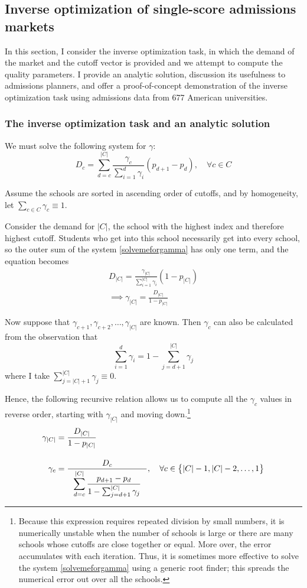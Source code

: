 \documentclass[12pt]{article}
\theoremstyle{definition}
\begin{document}
\subsection{Inverse optimization of single-score admissions markets}
In this section, I consider the inverse optimization task, in which the demand of the market and the cutoff vector is provided and we attempt to compute the quality parameters. I provide an analytic solution, discussion its usefulness to admissions planners, and offer a proof-of-concept demonstration of the inverse optimization task using admissions data from 677 American universities. 

\subsubsection{The inverse optimization task and an analytic solution}
We must solve the following system for $\gamma$:
\begin{equation}
D_c = \sum_{d=c}^{|C|} 
\frac{\gamma_c}{ \sum_{i=1}^d \gamma_i} 
\left(p_{d+1} - p_{d}\right),
\quad \forall c \in C
 \label{solvemeforgamma}
 \end{equation}

Assume the schools are sorted in ascending order of cutoffs, and by homogeneity, let $\sum_{c \in C} \gamma_c \equiv 1$.

Consider the demand for $|C|$, the school with the highest index and therefore highest cutoff. Students who get into this school necessarily get into every school, so the outer sum of the system \eqref{solvemeforgamma} has only one term, and the equation becomes
\begin{align}D_{|C|} =
\frac{\gamma_{|C|}}{ \sum_{i=1}^{|C|} \gamma_i} 
\left(1 - p_{|C|}\right) \\
\implies \gamma_{|C|} = \frac{D_{|C|}}{1 - p_{|C|}}
\end{align}

Now suppose that $\gamma_{c+1}, \gamma_{c+2}, \dots, \gamma_{|C|}$ are known. Then $\gamma_c$ can also be calculated from the observation that
\[\sum_{i=1}^d \gamma_i = 1 - \sum_{j=d+1}^{|C|} \gamma_j\]
where I take $\sum_{j=|C|+1}^{|C|} \gamma_j \equiv 0$.

Hence, the following recursive relation allows us to compute all the $\gamma_c$ values in reverse order, starting with $\gamma_{|C|}$ and moving down.\footnote{Because this expression requires repeated division by small numbers, it is numerically unstable when the number of schools is large or there are many schools whose cutoffs are close together or equal. More over, the error accumulates with each iteration. Thus, it is sometimes more effective to solve the system \eqref{solvemeforgamma} using a generic root finder; this spreads the numerical error out over all the schools.} 
\begin{align}
\gamma_{|C|} &= \frac{D_{|C|}}{1 - p_{|C|}} \\[1em]
\gamma_c &= \frac{D_c}{~~\mathlarger{\sum_{d=c}^{|C|} \frac{p_{d+1} - p_d}{1 - \sum_{j=d+1}^{|C|} \gamma_j} ~~}}, \quad \forall c \in \bigl\{ |C|-1, |C|-2, \dots, 1\bigr\} \label{gammarecursion}
\end{align}
\end{document}

